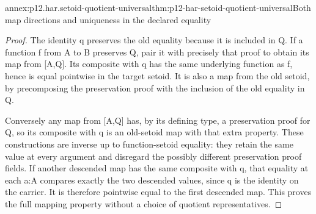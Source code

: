 \begin{annexitem}{annex:p12.har.setoid-quotient-universal}{thm:p12-har-setoid-quotient-universal}{Both map directions and uniqueness in the declared equality}
\begin{proof}
The identity q preserves the old equality because it is included in Q.
If a function f from A to B preserves Q, pair it with precisely that
proof to obtain its map from [A,Q]. Its composite with q has the same
underlying function as f, hence is equal pointwise in the target setoid.
It is also a map from the old setoid, by precomposing the preservation
proof with the inclusion of the old equality in Q.

Conversely any map from [A,Q] has, by its defining type, a preservation
proof for Q, so its composite with q is an old-setoid map with that
extra property. These constructions are inverse up to function-setoid
equality: they retain the same value at every argument and disregard
the possibly different preservation proof fields. If another descended
map has the same composite with q, that equality at each a:A compares
exactly the two descended values, since q is the identity on the carrier.
It is therefore pointwise equal to the first descended map. This proves
the full mapping property without a choice of quotient representatives.
\end{proof}
\end{annexitem}

